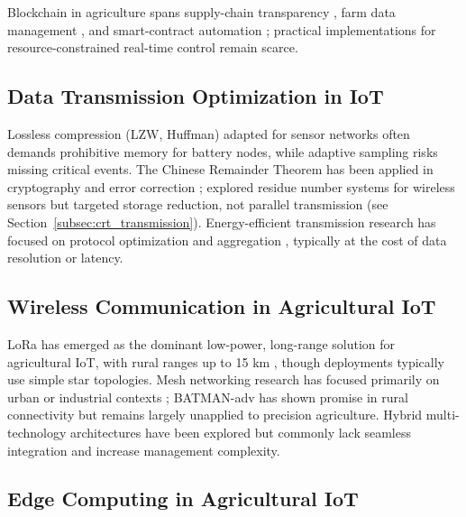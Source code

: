 \documentclass[pdflatex,sn-mathphys-num]{sn-jnl}
\theoremstyle{thmstyleone}
\theoremstyle{thmstyletwo}
\theoremstyle{thmstylethree}
\begin{document}
Blockchain in agriculture spans supply-chain transparency \cite{tian2016agri, kamilaris2019rise, oh2025foodsafety, galvez2018future}, farm data management \cite{lin2018blockchain, ferrag2020security, haque2024scalable}, and smart-contract automation \cite{rama2021systematic, patil2022blockchain}; practical implementations for resource-constrained real-time control remain scarce.

\subsection{Data Transmission Optimization in IoT}
\label{subsec:data_transmission}

Lossless compression (LZW, Huffman) adapted for sensor networks \cite{li2018lossless, marcelloni2009energy} often demands prohibitive memory for battery nodes, while adaptive sampling \cite{kjellsson2008adaptive} risks missing critical events. The Chinese Remainder Theorem has been applied in cryptography \cite{ding1996remainder, garner1959residue} and error correction \cite{goldreich1999china}; \cite{wang2018novel} explored residue number systems for wireless sensors but targeted storage reduction, not parallel transmission (see Section~\ref{subsec:crt_transmission}). Energy-efficient transmission research has focused on protocol optimization \cite{sanchez2021energy} and aggregation \cite{heinzelman2000energy}, typically at the cost of data resolution or latency.

\subsection{Wireless Communication in Agricultural IoT}
\label{subsec:wireless_communication}

LoRa has emerged as the dominant low-power, long-range solution for agricultural IoT, with rural ranges up to 15 km \cite{adelantado2017understanding, li2020performance, raj2017comprehensive}, though deployments typically use simple star topologies. Mesh networking research has focused primarily on urban or industrial contexts \cite{akylidiz2005wireless}; BATMAN-adv has shown promise in rural connectivity \cite{schmidt2010b.a.t.m.a.n.} but remains largely unapplied to precision agriculture. Hybrid multi-technology architectures have been explored \cite{chettri2020comprehensive} but commonly lack seamless integration and increase management complexity.

\subsection{Edge Computing in Agricultural IoT}
\label{subsec:edge_computing}
\end{document}
